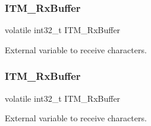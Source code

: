 \subsubsection{\texorpdfstring{I\+T\+M\+\_\+\+Rx\+Buffer}{ITM\_RxBuffer}\hspace{0.1cm}{\footnotesize\ttfamily [6/7]}}
{\footnotesize\ttfamily volatile int32\+\_\+t I\+T\+M\+\_\+\+Rx\+Buffer}

External variable to receive characters. \mbox{\label{group___c_m_s_i_s__core___debug_functions_ga12e68e55a7badc271b948d6c7230b2a8}} 
\subsubsection{\texorpdfstring{I\+T\+M\+\_\+\+Rx\+Buffer}{ITM\_RxBuffer}\hspace{0.1cm}{\footnotesize\ttfamily [7/7]}}
{\footnotesize\ttfamily volatile int32\+\_\+t I\+T\+M\+\_\+\+Rx\+Buffer}

External variable to receive characters. 